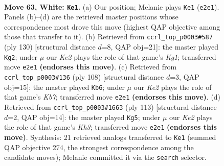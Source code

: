 \documentclass[11pt]{article}
\begin{document}
\clearpage

\begin{figure}[p]\centering
\begin{subfigure}{0.46\textwidth}\centering
\resizebox{\linewidth}{!}{%
\newchessgame
\chessboard[
  setfen={6k1/8/1P6/8/R3p1r1/8/4K3/8 w - - 5 63},
  showmover=false,
  pgfstyle=straightmove, color=movearrow, markmove={e2-e1}
]}
\caption{}
\end{subfigure}\hfill
\begin{subfigure}{0.46\textwidth}\centering
\resizebox{\linewidth}{!}{%
\newchessgame
\chessboard[
  setfen={4R3/8/4pr2/8/8/6p1/4k3/6K1 w - - 20 66},
  showmover=false,
  pgfstyle=straightmove, color=movearrow, markmove={g1-g2}
]}
\caption{}
\end{subfigure}
\\[4pt]
\begin{subfigure}{0.46\textwidth}\centering
\resizebox{\linewidth}{!}{%
\newchessgame
\chessboard[
  setfen={8/1K6/3k3r/8/2P5/8/7p/7R w - - 4 55},
  showmover=false,
  pgfstyle=straightmove, color=movearrow, markmove={b7-b6}
]}
\caption{}
\end{subfigure}\hfill
\begin{subfigure}{0.46\textwidth}\centering
\resizebox{\linewidth}{!}{%
\newchessgame
\chessboard[
  setfen={8/2r5/2P4k/8/7p/8/2R2K2/8 b - - 0 57},
  showmover=false,
  pgfstyle=straightmove, color=movearrow, markmove={h6-g5}
]}
\caption{}
\end{subfigure}
\caption{\textbf{Move 63, White: \texttt{Ke1}.} (a) Our position; Melanie plays \texttt{Ke1} (\texttt{e2e1}). Panels (b)--(d) are the retrieved master positions whose correspondence most drove this move (highest QAP objective among those that transfer to it). (b) Retrieved from \texttt{ccrl\_top\_p0003\#587} (ply 130) [structural distance $d$=8, QAP obj=21]: the master played \texttt{Kg2}; under $\mu$ our \emph{Ke2} plays the role of that game's \emph{Kg1}; transferred move \texttt{e2e1} \textbf{(endorses this move)}. (c) Retrieved from \texttt{ccrl\_top\_p0003\#136} (ply 108) [structural distance $d$=3, QAP obj=15]: the master played \texttt{Kb6}; under $\mu$ our \emph{Ke2} plays the role of that game's \emph{Kb7}; transferred move \texttt{e2e1} \textbf{(endorses this move)}. (d) Retrieved from \texttt{ccrl\_top\_p0003\#1663} (ply 113) [structural distance $d$=2, QAP obj=14]: the master played \texttt{Kg5}; under $\mu$ our \emph{Ke2} plays the role of that game's \emph{Kh3}; transferred move \texttt{e2e1} \textbf{(endorses this move)}. Synthesis: 21 retrieved analogs transferred to \texttt{Ke1} (summed QAP objective 274, the strongest correspondence among the candidate moves); Melanie committed it via the \texttt{search} selector.}
\label{fig:thought-m124}
\end{figure}
\end{document}
